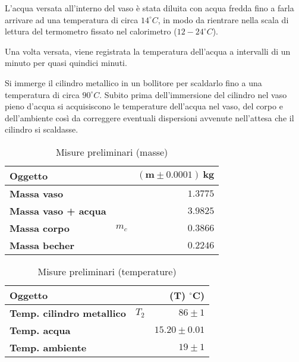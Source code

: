 \documentclass{article}
\begin{document}
	L'acqua versata all'interno del vaso è stata diluita con acqua fredda fino a farla arrivare ad una temperatura di circa \(14 ^\circ C\), in modo da rientrare nella scala di lettura del termometro fissato nel calorimetro (\(12-24 ^\circ C\)).
	
	Una volta versata, viene registrata la temperatura dell'acqua a intervalli di un minuto per quasi quindici minuti.
	
	Si immerge il cilindro metallico in un bollitore per scaldarlo fino a una temperatura di circa \(90 ^\circ C\). Subito prima dell'immersione del cilindro nel vaso pieno d'acqua si acquisiscono le temperature dell'acqua nel vaso, del corpo e dell'ambiente così da correggere eventuali dispersioni avvenute nell'attesa che il cilindro si scaldasse.
	
	\vspace{1cm}
	\begin{minipage}{0.4\textwidth}
		\begin{table}[H] \centering
			\begin{small}
				\begin{tabular}{@{}lrr@{}}\toprule
					\textbf{Oggetto}& &  \(\boldsymbol{(m \pm 0.0001) \SI{}{\kilogram}}\) \\ \midrule
					\textbf{Massa vaso}	&	 & \(1.3775\)   \\  \hdashline
					\textbf{Massa vaso + acqua}	&	 & \(3.9825\)   \\  \hdashline
					\textbf{Massa corpo}	& \(m_{c}\)	 & \(0.3866\)   \\  \hdashline
					\textbf{Massa becher}	&	 & \(0.2246\)   \\
					\bottomrule
				\end{tabular}
			\end{small}
			\caption{Misure preliminari (masse)}
		\end{table}
	\end{minipage}
	\begin{minipage}{0.6\textwidth}
		\begin{table}[H] \centering
			\begin{small}
				\begin{tabular}{@{}lrr@{}}\toprule
					\textbf{Oggetto}					&  			& \textbf{(\(\boldsymbol{T}\))} \(\boldsymbol{^\circ C}\))\\ \midrule
					\textbf{Temp. cilindro metallico}	& 	\(T_{2}\)		& \(86 \pm 1\)	 \\  \hdashline
					\textbf{Temp. acqua}				&					&\(15.20 \pm 0.01\)		 	 \\  \hdashline
					\textbf{Temp. ambiente}				&					& \(19 \pm 1\)		 	  \\  
					\bottomrule
				\end{tabular}
			\end{small}
			\caption{Misure preliminari (temperature)}
		\end{table}
	\end{minipage}
	\vspace{1cm}
	
\end{document}
